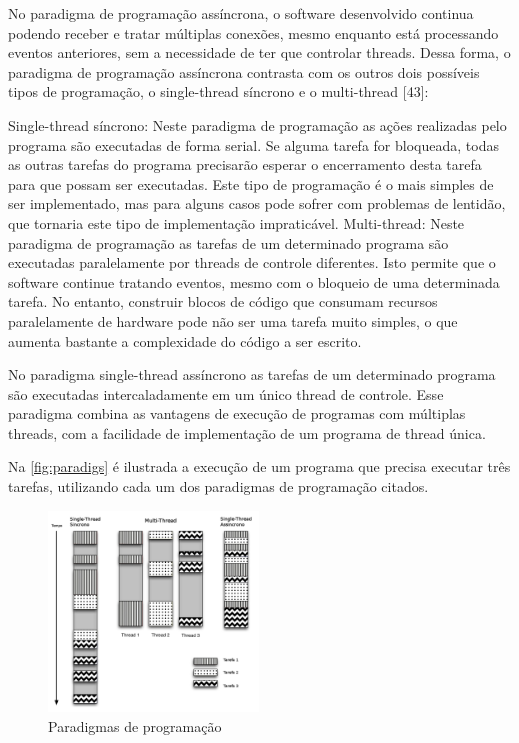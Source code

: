 \documentclass[journal]{IEEEtran}
\begin{document}
No paradigma de programação assíncrona, o software desenvolvido continua podendo receber e tratar múltiplas conexões, mesmo enquanto está processando eventos anteriores, sem a necessidade de ter que controlar threads. Dessa forma, o paradigma de programação assíncrona contrasta com os outros dois possíveis tipos de programação, o single-thread síncrono e o multi-thread [43]:

Single-thread síncrono: Neste paradigma de programação as ações realizadas pelo programa são executadas de forma serial. Se alguma tarefa for bloqueada, todas as outras tarefas do programa precisarão esperar o encerramento desta tarefa para que possam ser executadas. Este tipo de programação é o mais simples de ser implementado, mas para alguns casos pode sofrer com problemas de lentidão, que tornaria este tipo de implementação impraticável.
Multi-thread: Neste paradigma de programação as tarefas de um determinado programa são executadas paralelamente por threads de controle diferentes. Isto permite que o software continue tratando eventos, mesmo com o bloqueio de uma determinada tarefa. No entanto, construir blocos de código que consumam recursos paralelamente de hardware pode não ser uma tarefa muito simples, o que aumenta bastante a complexidade do código a ser escrito.

No paradigma single-thread assíncrono as tarefas de um determinado programa são executadas intercaladamente em um único thread de controle. Esse paradigma combina as vantagens de execução de programas com múltiplas threads, com a facilidade de implementação de um programa de thread única.

Na \autoref{fig:paradigs} é ilustrada a execução de um programa que precisa executar três tarefas, utilizando cada um dos paradigmas de programação citados.

\begin{figure}[htb]
    \begin{center}
        \includegraphics[width=2.2in]{Figuras/paradigmas.png}
        \caption{\label{fig:paradigs}Paradigmas de programação}
    \end{center}
\end{figure}
\end{document}
